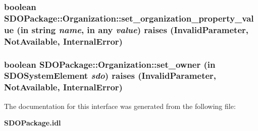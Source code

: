 \subsubsection{\setlength{\rightskip}{0pt plus 5cm}boolean SDOPackage::Organization::set\_\-organization\_\-property\_\-value (in string {\em name}, in any {\em value})  raises (Invalid\-Parameter, Not\-Available, Internal\-Error)}\label{interfaceSDOPackage_1_1Organization_SDOPackage_1_1Organizationa4}


\subsubsection{\setlength{\rightskip}{0pt plus 5cm}boolean SDOPackage::Organization::set\_\-owner (in {\bf SDOSystem\-Element} {\em sdo})  raises (Invalid\-Parameter, Not\-Available, Internal\-Error)}\label{interfaceSDOPackage_1_1Organization_SDOPackage_1_1Organizationa7}




The documentation for this interface was generated from the following file:\begin{CompactItemize}
\item 
{\bf SDOPackage.idl}\end{CompactItemize}
